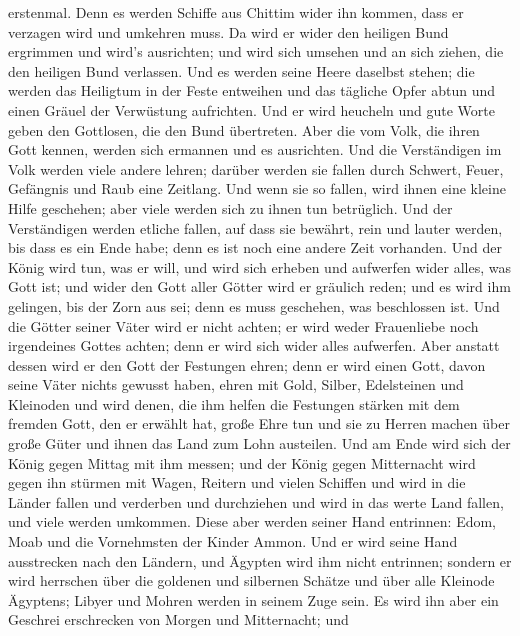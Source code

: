 erstenmal.  Denn es werden Schiffe aus Chittim wider ihn
kommen, dass er verzagen wird und umkehren muss. Da wird er wider den
heiligen Bund ergrimmen und wird's ausrichten; und wird sich umsehen und
an sich ziehen, die den heiligen Bund verlassen.  Und es
werden seine Heere daselbst stehen; die werden das Heiligtum in der
Feste entweihen und das tägliche Opfer abtun und einen Gräuel der
Verwüstung aufrichten.  Und er wird heucheln und gute Worte
geben den Gottlosen, die den Bund übertreten. Aber die vom Volk, die
ihren Gott kennen, werden sich ermannen und es ausrichten. 
Und die Verständigen im Volk werden viele andere lehren; darüber werden
sie fallen durch Schwert, Feuer, Gefängnis und Raub eine Zeitlang.
 Und wenn sie so fallen, wird ihnen eine kleine Hilfe
geschehen; aber viele werden sich zu ihnen tun betrüglich. 
Und der Verständigen werden etliche fallen, auf dass sie bewährt, rein
und lauter werden, bis dass es ein Ende habe; denn es ist noch eine
andere Zeit vorhanden.  Und der König wird tun, was er
will, und wird sich erheben und aufwerfen wider alles, was Gott ist; und
wider den Gott aller Götter wird er gräulich reden; und es wird ihm
gelingen, bis der Zorn aus sei; denn es muss geschehen, was beschlossen
ist.  Und die Götter seiner Väter wird er nicht achten; er
wird weder Frauenliebe noch irgendeines Gottes achten; denn er wird sich
wider alles aufwerfen.  Aber anstatt dessen wird er den
Gott der Festungen ehren; denn er wird einen Gott, davon seine Väter
nichts gewusst haben, ehren mit Gold, Silber, Edelsteinen und Kleinoden
 und wird denen, die ihm helfen die Festungen stärken mit
dem fremden Gott, den er erwählt hat, große Ehre tun und sie zu Herren
machen über große Güter und ihnen das Land zum Lohn austeilen.
 Und am Ende wird sich der König gegen Mittag mit ihm
messen; und der König gegen Mitternacht wird gegen ihn stürmen mit
Wagen, Reitern und vielen Schiffen und wird in die Länder fallen und
verderben und durchziehen  und wird in das werte Land
fallen, und viele werden umkommen. Diese aber werden seiner Hand
entrinnen: Edom, Moab und die Vornehmsten der Kinder Ammon.
 Und er wird seine Hand ausstrecken nach den Ländern, und
Ägypten wird ihm nicht entrinnen;  sondern er wird
herrschen über die goldenen und silbernen Schätze und über alle Kleinode
Ägyptens; Libyer und Mohren werden in seinem Zuge sein.  Es
wird ihn aber ein Geschrei erschrecken von Morgen und Mitternacht; und
